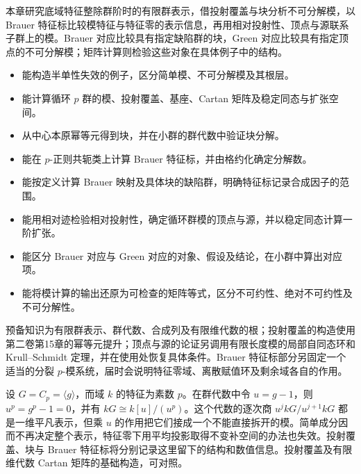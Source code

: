 
\begin{chapterabstract}
	本章研究底域特征整除群阶时的有限群表示，借投射覆盖与块分析不可分解模，以 Brauer 特征标比较模特征与特征零的表示信息，再用相对投射性、顶点与源联系子群上的模。Brauer 对应比较具有指定缺陷群的块，Green 对应比较具有指定顶点的不可分解模；矩阵计算则检验这些对象在具体例子中的结构。
\end{chapterabstract}

\begin{learninggoals}
	\begin{itemize}
		\item 能构造半单性失效的例子，区分简单模、不可分解模及其根层。
		\item 能计算循环 \(p\) 群的模、投射覆盖、基座、Cartan 矩阵及稳定同态与扩张空间。
		\item 从中心本原幂等元得到块，并在小群的群代数中验证块分解。
		\item 能在 \(p\)-正则共轭类上计算 Brauer 特征标，并由格约化确定分解数。
		\item 能按定义计算 Brauer 映射及具体块的缺陷群，明确特征标记录合成因子的范围。
		\item 能用相对迹检验相对投射性，确定循环群模的顶点与源，并以稳定同态计算一阶扩张。
		\item 能区分 Brauer 对应与 Green 对应的对象、假设及结论，在小群中算出对应项。
		\item 能将模计算的输出还原为可检查的矩阵等式，区分不可约性、绝对不可约性及不可分解性。
	\end{itemize}
	预备知识为有限群表示、群代数、合成列及有限维代数的根；投射覆盖的构造使用第二卷第15章的幂等元提升；顶点与源的论证另调用有限长度模的局部自同态环和 Krull--Schmidt 定理，并在使用处恢复具体条件。Brauer 特征标部分另固定一个适当的分裂 \(p\)-模系统，届时会说明特征零域、离散赋值环及剩余域各自的作用。
\end{learninggoals}

设 \(G=C_p=\langle g\rangle\)，而域 \(k\) 的特征为素数 \(p\)。在群代数中令 \(u=g-1\)，则 \(u^p=g^p-1=0\)，并有 \(kG\cong k[u]/(u^p)\)。这个代数的逐次商 \(u^j kG/u^{j+1}kG\) 都是一维平凡表示，但乘 \(u\) 的作用把它们接成一个不能直接拆开的模。简单成分因而不再决定整个表示，特征零下用平均投影取得不变补空间的办法也失效。投射覆盖、块与 Brauer 特征标将分别记录这里留下的结构和数值信息。投射覆盖及有限维代数 Cartan 矩阵的基础构造，可对照\cite[Sections 9.1--9.3, pp. 209--212]{EtingofEtAl2011RepresentationTheory}。

